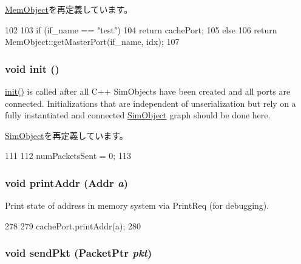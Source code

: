 \hyperlink{classMemObject_adc4e675e51defbdd1e354dac729d0703}{MemObject}を再定義しています。


\begin{DoxyCode}
102 {
103     if (if_name == "test")
104         return cachePort;
105     else
106         return MemObject::getMasterPort(if_name, idx);
107 }
\end{DoxyCode}
\hypertarget{classNetworkTest_a02fd73d861ef2e4aabb38c0c9ff82947}{
\subsubsection[{init}]{\setlength{\rightskip}{0pt plus 5cm}void init ()}}
\label{classNetworkTest_a02fd73d861ef2e4aabb38c0c9ff82947}
\hyperlink{classNetworkTest_a02fd73d861ef2e4aabb38c0c9ff82947}{init()} is called after all C++ SimObjects have been created and all ports are connected. Initializations that are independent of unserialization but rely on a fully instantiated and connected \hyperlink{classSimObject}{SimObject} graph should be done here. 

\hyperlink{classSimObject_a02fd73d861ef2e4aabb38c0c9ff82947}{SimObject}を再定義しています。


\begin{DoxyCode}
111 {
112     numPacketsSent = 0;
113 }
\end{DoxyCode}
\hypertarget{classNetworkTest_a88aa41e2693dd0091afae2604eba9bed}{
\subsubsection[{printAddr}]{\setlength{\rightskip}{0pt plus 5cm}void printAddr ({\bf Addr} {\em a})}}
\label{classNetworkTest_a88aa41e2693dd0091afae2604eba9bed}
Print state of address in memory system via PrintReq (for debugging). 


\begin{DoxyCode}
278 {
279     cachePort.printAddr(a);
280 }
\end{DoxyCode}
\hypertarget{classNetworkTest_afd43ca83ca8c1d5fde8a2f349aa2cdc0}{
\subsubsection[{sendPkt}]{\setlength{\rightskip}{0pt plus 5cm}void sendPkt ({\bf PacketPtr} {\em pkt})}}
\label{classNetworkTest_afd43ca83ca8c1d5fde8a2f349aa2cdc0}




